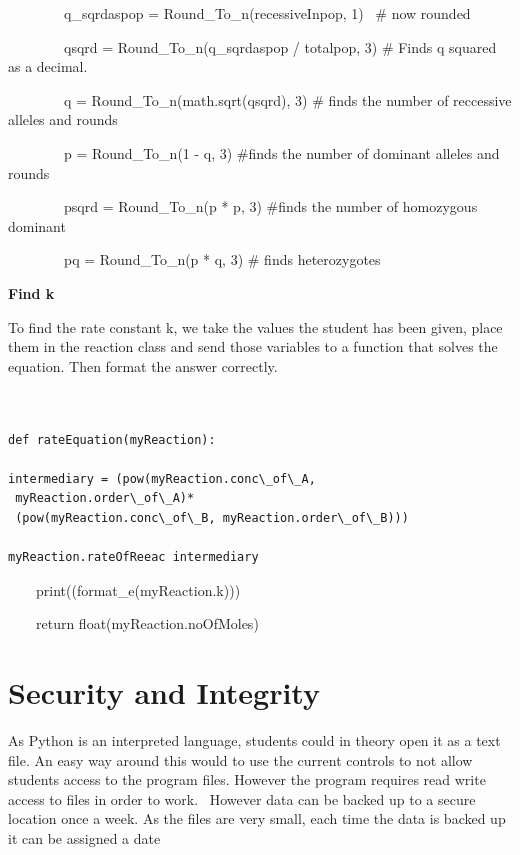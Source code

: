 \documentclass[a4paper,12pt]{report}
\begin{document}
\ \ \ \ \ \ \ \ q\_sqrdaspop = Round\_To\_n(recessiveInpop, 1) \ \# now rounded

\ \ \ \ \ \ \ \ qsqrd = Round\_To\_n(q\_sqrdaspop / totalpop, 3) \# Finds q squared as a decimal.

\ \ \ \ \ \ \ \ q = Round\_To\_n(math.sqrt(qsqrd), 3) \# finds the number of reccessive alleles and rounds

\ \ \ \ \ \ \ \ p = Round\_To\_n(1 - q, 3) \#finds the number of dominant alleles and rounds

\ \ \ \ \ \ \ \ psqrd = Round\_To\_n(p * p, 3) \#finds the number of homozygous dominant

\ \ \ \ \ \ \ \ pq = Round\_To\_n(p * q, 3) \# finds heterozygotes\\
\begin{flushleft}

\textbf{Find k}

To find the rate constant k, we take the values the student has been given, place them in the reaction class and send those variables to a function that solves the equation. Then format the answer correctly.
\end{flushleft}

\begin{verbatim}


def rateEquation(myReaction):

intermediary = (pow(myReaction.conc\_of\_A,
 myReaction.order\_of\_A)* 
 (pow(myReaction.conc\_of\_B, myReaction.order\_of\_B)))

myReaction.rateOfReeac intermediary
\end{verbatim}
\ \ \ \ print((format\_e(myReaction.k)))


\ \ \ \ return float(myReaction.noOfMoles)


\bigskip


\bigskip


\bigskip

\section{Security and Integrity}


\bigskip

As Python is an interpreted language, students could in theory open it as a text file. An easy way around this would to use the current controls to not allow students access to the program files. However the program requires read write access to files in order to work. \ However data can be backed up to a secure location once a week. As the files are very small, each time the data is backed up it can be assigned a date
\end{document}
